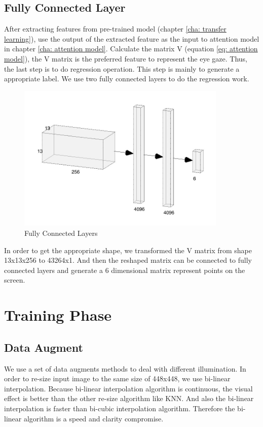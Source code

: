 \documentclass[senior]{IPSstyle}
\begin{document}
\subsection{Fully Connected Layer}\label{cha: fcn}
After extracting features from pre-trained model (chapter \ref{cha: transfer learning}), use the output of the extracted feature as the input to attention model in chapter \ref{cha: attention model}.
Calculate the matrix V (equation \ref{eq: attention model}), the V matrix is the preferred feature to represent the eye gaze.
Thus, the last step is to do regression operation.
This step is mainly to generate a appropriate label.
We use two fully connected layers to do the regression work.
\begin{figure}
    \centering
    \includegraphics[width=10cm]{MasterThesis-master/images/fcn.jpg}
    \caption{Fully Connected Layers}
    \label{fig:fcn}
\end{figure}
In order to get the appropriate shape, we transformed the V matrix from shape 13x13x256 to 43264x1.
And then the reshaped matrix can be connected to fully connected layers and generate a 6 dimensional matrix represent points on the screen.

\section{Training Phase}
\subsection{Data Augment}
We use a set of data augments methods to deal with different illumination.
In order to re-size input image to the same size of 448x448, we use bi-linear interpolation.
Because bi-linear interpolation algorithm is continuous, the visual effect is better than the other re-size algorithm like KNN\cite{han2013comparison}.
And also the bi-linear interpolation is faster than bi-cubic interpolation algorithm.
Therefore the bi-linear algorithm is a speed and clarity compromise.
\end{document}
